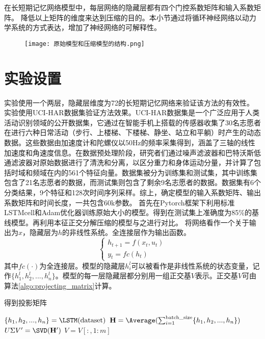 在长短期记忆网络模型中，每层网络的隐藏层都有四个门控系数矩阵和输入系数矩阵。
降低以上矩阵的维度来达到压缩的目的。本小节通过将循环神经网络以动力学系统的方式表达，增加了神经网络的可解释性。

\begin{figure}[!htbp]
  \centering
  \texttt{[image: 原始模型和压缩模型的结构.png]}
  \label{fig:原始模型和压缩模型的结构}
\end{figure}
\section{实验设置}
实验使用一个两层，隐藏层维度为72的长短期记忆网络来验证该方法的有效性。
实验使用UCI-HAR数据集\cite{anguita2012human}验证方法效果。UCI-HAR数据集是一个广泛应用于人类活动识别领域的公开数据集，它通过在智能手机上搭载的传感器收集了30名志愿者在进行六种日常活动（步行、上楼梯、下楼梯、静坐、站立和平躺）时产生的动态数据。这些数据由加速度计和陀螺仪以50Hz的频率采集得到，涵盖了三轴的线性加速度和角速度信息。在数据预处理阶段，研究者们通过噪声滤波器和巴特沃斯低通滤波器对原始数据进行了清洗和分离，以区分重力和身体运动分量，并计算了包括时域和频域在内的561个特征向量。数据集被分为训练集和测试集，其中训练集包含了21名志愿者的数据，而测试集则包含了剩余9名志愿者的数据。数据集有6个分类结果，9个特征和128次时间序列采样。综上，确定模型的输入系数矩阵、输出系数矩阵和时间长度，一共包含60k参数。
首先在Pytorch框架下利用标准LSTMcell和Adam优化器训练原始大小的模型。得到在测试集上准确度为85\%的基线模型。再利用本征正交分解压缩的模型与之进行对比。
将网络看作一个关于输出为$x$，隐藏层为$h$的非线性系统。全连接层作为输出函数。
\begin{equation}
  \label{eq:22}
\left\{ \begin{array}{l}
  {h_{t + 1}} = f({x_t},{u_t})\\
  {y_t} = fc({h_t})
  \end{array} \right.
\end{equation}
其中$fc( \cdot )$为全连接层。模型的隐藏层$h_i^l$可以被看作是非线性系统的状态变量，记作$\{ h_1^l,h_2^l,...,h_n^l\}$。模型的每一层隐藏层都分别用一组正交基$V$表示。正交基$V$可由算法\ref{algo:projecting_matrix}计算。
\begin{algorithm}[!htbp]
  \caption{得到投影矩阵}
  \label{algo:projecting_matrix}
  \DontPrintSemicolon
  
  
  \vspace{5pt}
  
  $\{h_1, h_2, ..., h_n\} = \LSTM(\text{dataset})$\;
  $\mathbf{H} = \Average(\sum_{i=1}^{\text{batch\_size}} \{h_1, h_2, ..., h_n\})$\;
  $U \Sigma V' = \SVD(\mathbf{H}')$\;
  $V = V[:, 1:m]$\;
  
\end{algorithm}

